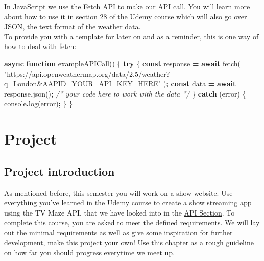 \documentclass[
]{article}
\newenvironment{Shaded}{\begin{snugshade}}{\end{snugshade}}
\newcommand{\BuiltInTok}[1]{#1}
\newcommand{\CommentTok}[1]{\textcolor[rgb]{0.56,0.35,0.01}{\textit{#1}}}
\newcommand{\ControlFlowTok}[1]{\textcolor[rgb]{0.13,0.29,0.53}{\textbf{#1}}}
\newcommand{\FunctionTok}[1]{\textcolor[rgb]{0.00,0.00,0.00}{#1}}
\newcommand{\KeywordTok}[1]{\textcolor[rgb]{0.13,0.29,0.53}{\textbf{#1}}}
\newcommand{\NormalTok}[1]{#1}
\newcommand{\OperatorTok}[1]{\textcolor[rgb]{0.81,0.36,0.00}{\textbf{#1}}}
\newcommand{\StringTok}[1]{\textcolor[rgb]{0.31,0.60,0.02}{#1}}
\begin{document}
In JavaScript we use the \href{https://developer.mozilla.org/de/docs/Web/API/Fetch_API}{Fetch API} to make our API call. You will learn more about how to use it in section \href{https://www.udemy.com/course/the-web-developer-bootcamp/learn/lecture/22051352\#overview}{28} of the Udemy course which will also go over \protect\hyperlink{json}{JSON}, the text format of the weather data.\\
To provide you with a template for later on and as a reminder, this is one way of how to deal with fetch:

\begin{Shaded}
\begin{Highlighting}[]
\KeywordTok{async} \KeywordTok{function} \FunctionTok{exampleAPICall}\NormalTok{() \{}
  \ControlFlowTok{try}\NormalTok{ \{}
    \KeywordTok{const}\NormalTok{ response }\OperatorTok{=} \ControlFlowTok{await} \FunctionTok{fetch}\NormalTok{(}
      \StringTok{"https://api.openweathermap.org/data/2.5/weather?q=London\&AAPID=YOUR\_API\_KEY\_HERE"}
\NormalTok{    )}\OperatorTok{;}
    \KeywordTok{const}\NormalTok{ data }\OperatorTok{=} \ControlFlowTok{await}\NormalTok{ response}\OperatorTok{.}\FunctionTok{json}\NormalTok{()}\OperatorTok{;}
    \CommentTok{/* your code here to work with the data */}
\NormalTok{  \} }\ControlFlowTok{catch}\NormalTok{ (error) \{}
    \BuiltInTok{console}\OperatorTok{.}\FunctionTok{log}\NormalTok{(error)}\OperatorTok{;}
\NormalTok{  \}}
\NormalTok{\}}
\end{Highlighting}
\end{Shaded}

\hypertarget{project}{%
\section{Project}\label{project}}

\hypertarget{project-introduction}{%
\subsection{Project introduction}\label{project-introduction}}

As mentioned before, this semester you will work on a show website. Use everything you've learned in the Udemy course to create a show streaming app using the TV Maze API, that we have looked into in the \protect\hyperlink{api}{API Section}. To complete this course, you are asked to meet the defined requirements. We will lay out the minimal requirements as well as give some inspiration for further development, make this project your own! Use this chapter as a rough guideline on how far you should progress everytime we meet up.
\end{document}

